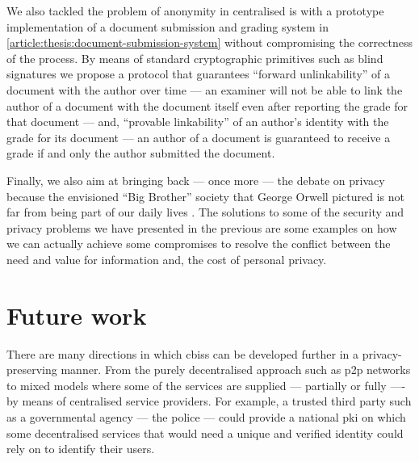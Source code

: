 We also tackled the problem of anonymity in centralised \ac{is} with a prototype 
implementation of a document submission and grading system in \cref{article:thesis:document-submission-system} 
without compromising the correctness of the process. By means of standard cryptographic 
primitives such as blind signatures we propose a protocol that guarantees ``forward 
unlinkability'' of a document with the author over time --- an examiner will not 
be able to link the author of a document with the document itself even after reporting 
the grade for that document --- and, ``provable linkability'' of an author's identity 
with the grade for its document --- an author of a document is guaranteed to receive 
a grade if and only the author submitted the document.

Finally, we also aim at bringing back --- once more --- the debate on privacy because 
the envisioned ``Big Brother'' society that George Orwell pictured is not far from 
being part of our daily lives \cite{Orwell49}. The solutions to some of the security 
and privacy problems we have presented in the previous  
are some examples on how we can actually achieve some compromises to resolve the 
conflict between the need and value for information and, the cost of personal privacy.

\section{Future work}
    \label{section:thesis:future-work}
There are many directions in which \acp{cbis} can be developed further in a privacy-preserving 
manner. From the purely decentralised approach such as \ac{p2p} networks to mixed 
models where some of the services are supplied --- partially or fully ---- by means 
of centralised service providers. For example, a trusted third party such as a governmental 
agency --- the police --- could provide a national \ac{pki} on which some decentralised
services that would need a unique and verified identity could rely on to identify their 
users.


